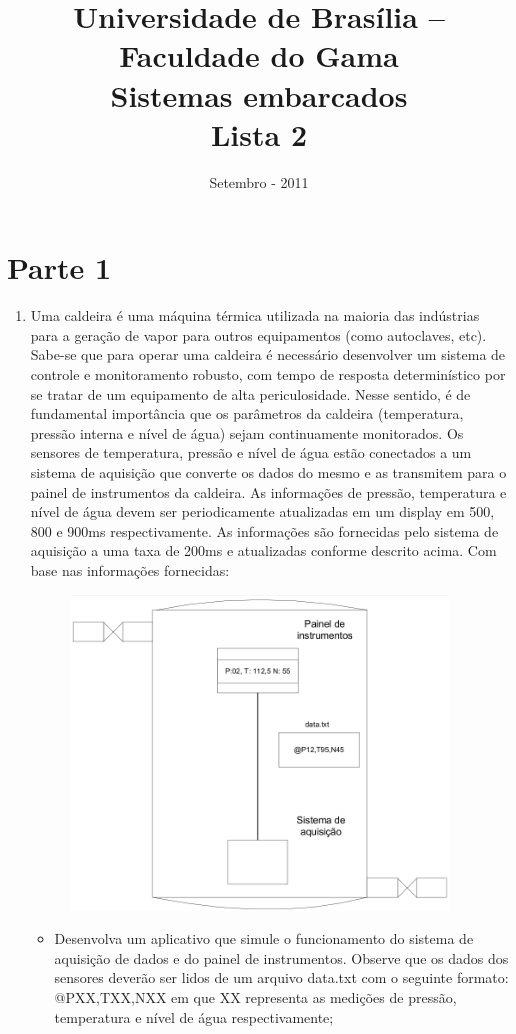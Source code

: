 \documentclass[a4paper,10pt]{article}
\title{ \textbf{Universidade de Brasília -- Faculdade do Gama \\ Sistemas embarcados \\ Lista 2 }}
\date{Setembro - 2011}
\begin{document}
\maketitle

\section{Parte 1}
\begin{enumerate}
 \item Uma caldeira é uma máquina térmica utilizada na maioria das indústrias para a geração de vapor para outros equipamentos (como autoclaves, etc). 
      Sabe-se que para operar uma caldeira é necessário desenvolver um sistema de controle e monitoramento robusto, com tempo de resposta 
      determinístico por se tratar de um equipamento de alta periculosidade. Nesse sentido, é de fundamental importância que os parâmetros da 
      caldeira (temperatura, pressão interna e nível de água) sejam continuamente monitorados. Os sensores de temperatura, pressão e nível de água 
      estão conectados a um sistema de aquisição que converte os dados do mesmo e as transmitem para o painel de instrumentos da caldeira. As
      informações de pressão, temperatura e nível de água devem ser periodicamente atualizadas em um display em 500, 800 e 900ms respectivamente. 
      As informações são fornecidas pelo sistema de aquisição a uma taxa de 200ms e atualizadas conforme descrito acima. Com base nas informações 
      fornecidas:
\begin{figure}[ht]
 \center
 \includegraphics[width=10cm]{imagem/caldeira.png}
\end{figure}

\newpage

  \begin{itemize}
   \item Desenvolva um aplicativo que simule o funcionamento do sistema de aquisição de dados e do painel de instrumentos. Observe que os dados dos 
	sensores deverão ser lidos de um arquivo data.txt com o seguinte formato: @PXX,TXX,NXX em que XX representa as medições de pressão, 
	temperatura e nível de água respectivamente;
  \end{itemize}


\end{enumerate}
\end{document}
